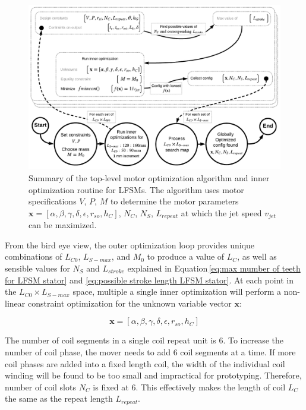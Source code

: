                 
                \begin{figure}
                  \centering
                  \includegraphics[width=5.9in]{chap4/images2/RSM_LFSM_optimization.pdf}
                  \caption{Summary of the top-level motor optimization algorithm and inner optimization routine for \acsp{LFSM}. The algorithm uses motor specifications $V$, $P$, $M$ to determine the motor parameters $\textbf{x}=[\alpha,\beta,\gamma,\delta,\epsilon,r_{so},h_C]$, $N_C$, $N_S$, $L_{repeat}$ at which the jet speed $v_{jet}$ can be maximized.}
                  \label{fig:chapter/rsm/fsm/top level optmization}
                \end{figure}
                
                
                From the bird eye view, the outer optimization loop provides unique combinations of $L_{C0}$, $L_{S-max}$, and $M_0$ to produce a value of $L_C$, as well as sensible values for $N_S$ and $L_{stroke}$ explained in Equation\,\ref{eq:max mumber of teeth for LFSM stator} and \ref{eq:possible stroke length LFSM stator}. At each point in the $L_{C0} \times L_{S-max}$ space, multiple a single inner optimization will perform a non-linear constraint optimization for the unknown variable vector $\textbf{x}$:
            
            
                \begin{equation}
                    \textbf{x} = \left[ \alpha,\beta,\gamma,\delta,\epsilon,r_{so},h_{C} \right]
                    \label{eq:inner optimization x of FSM}
                \end{equation}
                
                
                The number of coil segments in a single coil repeat unit is 6. To increase the number of coil phase, the mover needs to add 6 coil segments at a time. If more coil phases are added into a fixed length coil, the width of the individual coil winding will be found to be too small and impractical for prototyping. Therefore, number of coil slots $N_C$ is fixed at $6$. This effectively makes the length of coil $L_C$ the same as the repeat length $L_{repeat}$. 
                
